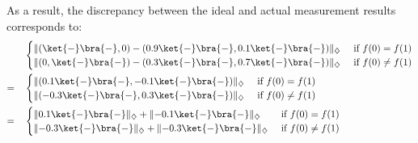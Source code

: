   As a result, the discrepancy between the ideal and actual measurement results corresponds to:
  \begin{equation}
    \begin{split}
      \quad &
      \begin{cases}
        \lVert(\ket{-} \bra{-},0) - (0.9\ket{-} \bra{-},0.1\ket{-} \bra{-})   \rVert_{\diamondsuit} &\text{ if }   f(0)= f(1) \\
        \lVert (0,\ket{-} \bra{-}) - (0.3\ket{-} \bra{-}, 0.7\ket{-} \bra{-}) \rVert_{\diamondsuit} &\text{ if }   f(0) \neq f(1) 
      \end{cases} \\
      = \quad &
      \begin{cases}
        \lVert(0.1\ket{-} \bra{-},-0.1\ket{-} \bra{-})   \rVert_{\diamondsuit} &\text{ if }   f(0)= f(1) \\
        \lVert (-0.3\ket{-} \bra{-}, 0.3\ket{-} \bra{-}) \rVert_{\diamondsuit} &\text{ if }   f(0) \neq f(1)
      \end{cases} \\
      = \quad &
      \begin{cases}
        \lVert 0.1\ket{-} \bra{-}\rVert_{\diamondsuit} + \lVert - 0.1 \ket{-} \bra{-}\rVert_{\diamondsuit} &\text{ if }   f(0)= f(1) \\
        \lVert -0.3\ket{-} \bra{-}\rVert_{\diamondsuit} + \lVert - 0.3 \ket{-} \bra{-}\rVert_{\diamondsuit} &\text{ if }   f(0) \neq f(1)
      \end{cases} \\
    \end {split}
    \end{equation}
  

